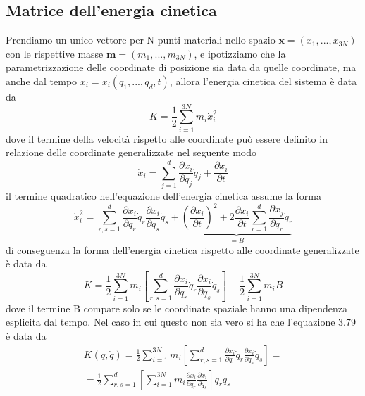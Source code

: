 \subsection{Matrice dell'energia cinetica}
Prendiamo un unico vettore per N punti materiali nello spazio $\bm{x} = (x_1,...,x_{3N})$ con le rispettive masse $\bm{m} = (m_1,...,m_{3N})$, e ipotizziamo che la parametrizzazione delle coordinate di posizione sia data da quelle coordinate, ma anche dal tempo $x_i = x_i(q_1,...,q_d,t)$, allora l'energia cinetica del sistema \`{e} data da 
\begin{equation}
	K = \frac{1}{2}\sum_{i=1}^{3N}m_i \dot{x}_{i}^2
\end{equation}
dove il termine della velocit\`{a} rispetto alle coordinate pu\`{o} essere definito in relazione delle coordinate generalizzate nel seguente modo
\begin{equation}
	\dot{x}_{i} = \sum_{j=1}^{d} \frac{\partial x_i}{\partial q_j}\dot{q}_j + \frac{\partial x_i}{\partial t}
\end{equation}
il termine quadratico nell'equazione dell'energia cinetica assume la forma 
\begin{equation}
\dot{x}_i^2=\sum_{r, s=1}^d \frac{\partial x_i}{\partial q_r} \dot{q}_r \frac{\partial x_i}{\partial q_s} \dot{q}_s+\underbrace{\left(\frac{\partial x_i}{\partial t}\right)^2+ 2 \frac{\partial x_i}{\partial t} \sum_{r=1}^d \frac{\partial x_j}{\partial q_r} \dot{q}_r}_{= B}
\end{equation}
di conseguenza la forma dell'energia cinetica rispetto alle coordinate generalizzate \`e data da 
\begin{equation}
K=\frac{1}{2} \sum_{i=1}^{3 N} m_i\left[\sum_{r, s=1}^d \frac{\partial x_i}{\partial q_r} \dot{q}_r \frac{\partial x_i}{\partial q_s} \dot{q}_s\right]+\frac{1}{2} \sum_{i=1}^{3 N} m_i B
\end{equation}
dove il termine B compare solo se le coordinate spaziale hanno una dipendenza esplicita dal tempo. Nel caso in cui questo non sia vero si ha che l'equazione 3.79 \`{e} data da 
\begin{equation}
	\begin{aligned}
	K(q,\dot{q}) = \frac{1}{2} \sum_{i=1}^{3 N} m_i\left[\sum_{r, s=1}^d \frac{\partial x_i}{\partial q_r} \dot{q}_r \frac{\partial x_i}{\partial q_s} \dot{q}_s\right] = \\[0.1in] 
	=\frac{1}{2} \sum_{r,s =1}^{d} \left [ \sum_{i=1}^{3N} m_i \frac{\partial x_i}{\partial q_r} \frac{\partial x_i}{\partial q_s} \right ]\dot{q}_r\dot{q}_s 
	\end{aligned}
\end{equation}
